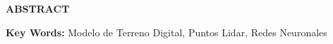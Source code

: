 \noindent\textbf{\large ABSTRACT}
    
\noindent\lipsum[1-2]

\vspace{6pt}

\noindent\textbf{Key Words:} Modelo de Terreno Digital, Puntos Lidar, Redes Neuronales
